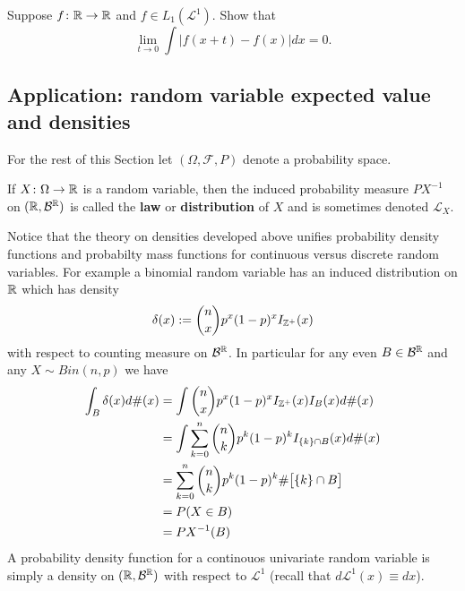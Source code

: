 \begin{exercise}
Suppose $f\colon \Bbb R\rightarrow \Bbb R$ and $f\in L_1(\mathcal L^1)$. Show that
\[\lim_{t\rightarrow 0} \int |f(x+t)- f(x)| dx=0. \]
\end{exercise}





\subsection{Application: random variable expected value and densities}
\label{app1}

\begin{sectionassumption} For the rest of this Section let $(\Omega, \mathcal F, P)$ denote a probability space.
\end{sectionassumption}

\begin{definition}[\bf Distribution of $X$]
If $X\colon \Omega\rightarrow \Bbb R$ is a random variable, then the induced probability measure $P\!X^{-1}$ on $(\Bbb R, \mathcal B^{\Bbb R})$ is called the {\bf law} or {\bf distribution} of $X$ and is sometimes denoted $\mathcal L_X$.
\end{definition}

Notice that the theory on densities developed above unifies probability density functions and probabilty mass functions for continuous versus discrete random variables. For example a binomial random variable has an induced distribution on $\Bbb R$ which has density
\[
\delta(x):= {n \choose x} p^x (1-p)^x I_{\Bbb Z^+}(x)
\]
with respect to counting measure on $\mathcal B^{\Bbb R}$.
In particular for any even $B\in \mathcal B^{\Bbb R}$ and any $X\sim Bin(n, p)$ we have
\begin{align*}
\int_B \delta(x)d\#(x)
& =\int {n \choose x} p^x (1-p)^x I_{\Bbb Z^+}(x)I_B(x) d\#(x)  \\
& =\int  \sum_{k=0}^n {n \choose k} p^k (1-p)^k I_{\{k\}\cap B}(x)  d\#(x)  \\
&= \sum_{k=0}^n {n \choose k} p^k (1-p)^k \#\bigl[\{k\}\cap B\bigr]\\
&= P(X\in B) \\
& = PX^{-1}(B)
\end{align*}
A probability density function for a continouos univariate random variable is simply a density on $(\Bbb R, \mathcal B^{\Bbb R})$ with respect to $\mathcal L^1$ (recall that $d\mathcal L^1(x)\equiv dx$).



